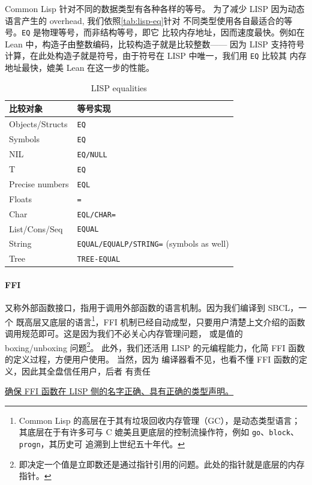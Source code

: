 \documentclass[a4paper, 11pt]{article}
\theoremstyle{remark}\newtheorem*{remark}{Remark}
\theoremstyle{definition}\newtheorem*{definition}{Definition}
\begin{document}
Common Lisp 针对不同的数据类型有各种各样的等号。
为了减少 LISP 因为动态语言产生的 overhead, 我们依照\autoref{tab:lisp-eq}针对
不同类型使用各自最适合的等号。\texttt{EQ} 是物理等号，而非结构等号，即它
比较内存地址，因而速度最快。例如在 Lean 中，构造子由整数编码，比较构造子就是比较整数——
因为 LISP 支持符号计算，在此处构造子就是符号，由于符号在 LISP 中唯一，我们用 \texttt{EQ} 比较其
内存地址最快，媲美 Lean 在这一步的性能。
\begin{table}[]
  \centering
  \begin{tabular}{@{}ll@{}}
    \toprule
    \textbf{比较对象} & \textbf{等号实现}                               \\ \midrule
    Objects/Structs               & \texttt{EQ}                                         \\
    Symbols                       & \texttt{EQ}                                         \\
    NIL                           & \texttt{EQ/NULL}                                  \\
    T                             & \texttt{EQ}                                         \\
    Precise numbers               & \texttt{EQL}                                        \\
    Floats                        & \texttt{=}                                          \\
    Char                          & \texttt{EQL/CHAR=}                                \\
    List/Cons/Seq                 & \texttt{EQUAL}                                      \\
    String                        & \texttt{EQUAL/EQUALP/STRING=} (symbols as well) \\
    Tree                          & \texttt{TREE-EQUAL}                                 \\ \bottomrule
  \end{tabular}
  \caption{LISP equalities}\label{tab:lisp-eq}
\end{table}

\paragraph{FFI} 又称外部函数接口，指用于调用外部函数的语言机制。因为我们编译到 SBCL，一个
既高层又底层的语言\footnote{
  Common Lisp 的高层在于其有垃圾回收内存管理（GC），是动态类型语言；
  其底层在于有许多可与 C 媲美且更底层的控制流操作符，例如
  \texttt{go}、\texttt{block}、\texttt{progn}，其历史可
  追溯到上世纪五十年代。
}，FFI 机制已经自动成型，只要用户清楚上文介绍的函数调用规范即可。这是因为我们不必关心内存管理问题，
或是值的 boxing/unboxing 问题\footnote{即决定一个值是立即数还是通过指针引用的问题。此处的指针就是底层的内存指针。}。
此外，我们还活用 LISP 的元编程能力，化简 FFI 函数的定义过程，方便用户使用。
当然，因为 \Tigris 编译器看不见，也看不懂 FFI 函数的定义，因此其全盘信任用户，后者
有责任
\begin{center}
  \underline{确保 FFI 函数在 LISP 侧的名字正确、具有正确的类型声明。}
\end{center}
\end{document}

